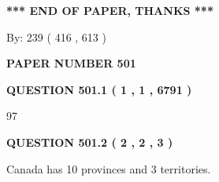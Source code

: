 \documentclass[12pt]{article}
\begin{document}
 
 
 
   
   
 \vspace{0.2in}
 
   
   
   
   
\vspace{1.0in} 
{\textbf{\large{ *** END OF PAPER, THANKS *** }}} 
   
   
\hspace{1.0in} By: 
 239 ( 416 ,  613 )
   
   
   
   
\newpage 
\setcounter{page}{ 
   501001 } 
   
   
   
   
 {\textbf{ \Large{ PAPER NUMBER  501  }}}
   
   
\vspace{0.2in}
   
   
   
   
   
   
 \vspace{0.2in}
 
 
 
 
   
   
  
\vspace{0.2in}
  
{\textbf{\Large{QUESTION
501.1 
 ( 1 , 1 , 6791 )
}}}
  
  
 
 
\noindent{}

97
 
 
  
\vspace{0.2in}
  
{\textbf{\Large{QUESTION
501.2 
 ( 2 , 2 , 3 )
}}}
  
  
 
 
\noindent{}
 
 
Canada has 10  provinces and 3 territories.
 
 
 
 
   
   
 \vspace{0.2in}
 
   
   
\end{document}
